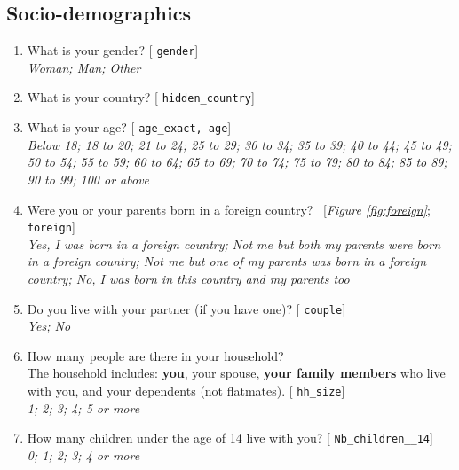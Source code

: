  \subsection*{Socio-demographics} 
 \begin{enumerate}[resume] 
\item  \label{q:gender} What is your gender? [%
\verb|gender|]
  \\ \textit{Woman; Man; Other}

\item  \label{q:hidden_country} What is your country? [%
\verb|hidden_country|]


\item  \label{q:age_exact} What is your age? [%
\verb|age_exact, age|]
  \\ \textit{Below 18; 18 to 20; 21 to 24; 25 to 29; 30 to 34; 35 to 39; 40 to 44; 45 to 49; 50 to 54; 55 to 59; 60 to 64; 65 to 69; 70 to 74; 75 to 79; 80 to 84; 85 to 89; 90 to 99; 100 or above}

\item  \label{q:foreign} Were you or your parents born in a foreign country?~ [\textit{Figure \ref{fig:foreign}}; 
\verb|foreign|]
  \\ \textit{Yes, I was born in a foreign country; Not me but both my parents were born in a foreign country; Not me but one of my parents was born in a foreign country; No, I was born in this country and my parents too}

\item  \label{q:couple} Do you live with your partner (if you have one)? [%
\verb|couple|]
  \\ \textit{Yes; No}

\item  \label{q:hh_size} How many people are there in your household? \\The household includes: \textbf{you}, your spouse, \textbf{your family members} who live with you, and your dependents (not flatmates). [%
\verb|hh_size|]
  \\ \textit{1; 2; 3; 4; 5 or more}

\item  \label{q:Nb_children__14} How many children under the age of 14 live with you? [%
\verb|Nb_children__14|]
  \\ \textit{0; 1; 2; 3; 4 or more}


\end{enumerate}
